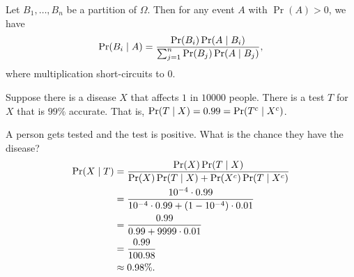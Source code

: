 \begin{theorem} \label{thm:conditional:bayes}
    Let $B_1, \dots, B_n$ be a partition of $\Omega$.
    Then for any event $A$ with $\Pr(A) > 0$, we have \[
        \Pr(B_i \mid A) = \frac{\Pr(B_i) \Pr(A \mid B_i)}{\sum_{j = 1}^{n} \Pr(B_j) \Pr(A \mid B_j)},
    \] where multiplication short-circuits to $0$.
\end{theorem}

\begin{example}
    Suppose there is a disease $X$ that affects $1$ in $10000$ people.
    There is a test $T$ for $X$ that is $99\%$ accurate.
    That is, $\Pr(T \mid X) = 0.99 = \Pr(T^c \mid X^c)$.

    A person gets tested and the test is positive.
    What is the chance they have the disease?
    \begin{align*}
        \Pr(X \mid T) &= \frac{\Pr(X) \Pr(T \mid X)}{\Pr(X) \Pr(T \mid X)
                + \Pr(X^{c}) \Pr(T \mid X^{c})} \\
            &= \frac{10^{-4} \cdot 0.99}{10^{-4} \cdot 0.99 + (1 - 10^{-4}) \cdot 0.01} \\
            &= \frac{0.99}{0.99 + 9999 \cdot 0.01} \\
            &= \frac{0.99}{100.98} \\
            &\approx 0.98\%.
    \end{align*}
\end{example}
